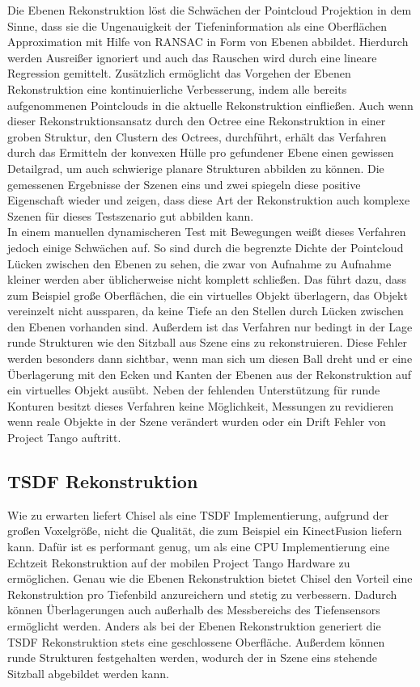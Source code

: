 Die Ebenen Rekonstruktion löst die Schwächen der Pointcloud Projektion in dem Sinne, dass sie die Ungenauigkeit der Tiefeninformation als eine Oberflächen Approximation mit Hilfe von RANSAC in Form von Ebenen abbildet. Hierdurch werden Ausreißer ignoriert und auch das Rauschen wird durch eine lineare Regression gemittelt. Zusätzlich ermöglicht das Vorgehen der Ebenen Rekonstruktion eine kontinuierliche Verbesserung, indem alle bereits aufgenommenen Pointclouds in die aktuelle Rekonstruktion einfließen. Auch wenn dieser Rekonstruktionsansatz durch den Octree eine Rekonstruktion in einer groben Struktur, den Clustern des Octrees, durchführt, erhält das Verfahren durch das Ermitteln der konvexen Hülle pro gefundener Ebene einen gewissen Detailgrad, um auch schwierige planare Strukturen abbilden zu können. Die gemessenen Ergebnisse der Szenen eins und zwei spiegeln diese positive Eigenschaft wieder und zeigen, dass diese Art der Rekonstruktion auch komplexe Szenen für dieses Testszenario gut abbilden kann.\\

In einem manuellen dynamischeren Test mit Bewegungen weißt dieses Verfahren jedoch einige Schwächen auf. So sind durch die begrenzte Dichte der Pointcloud Lücken zwischen den Ebenen zu sehen, die zwar von Aufnahme zu Aufnahme kleiner werden aber üblicherweise nicht komplett schließen. Das führt dazu, dass zum Beispiel große Oberflächen, die ein virtuelles Objekt überlagern, das Objekt vereinzelt nicht aussparen, da keine Tiefe an den Stellen durch Lücken zwischen den Ebenen vorhanden sind. Außerdem ist das Verfahren nur bedingt in der Lage runde Strukturen wie den Sitzball aus Szene eins zu rekonstruieren. Diese Fehler werden besonders dann sichtbar, wenn man sich um diesen Ball dreht und er eine Überlagerung mit den Ecken und Kanten der Ebenen aus der Rekonstruktion auf ein virtuelles Objekt ausübt. Neben der fehlenden Unterstützung für runde Konturen besitzt dieses Verfahren keine Möglichkeit, Messungen zu revidieren wenn reale Objekte in der Szene verändert wurden oder ein Drift Fehler von Project Tango auftritt.

\subsection*{TSDF Rekonstruktion}

Wie zu erwarten liefert Chisel als eine TSDF Implementierung, aufgrund der großen Voxelgröße, nicht die Qualität, die zum Beispiel ein KinectFusion liefern kann. Dafür ist es performant genug, um als eine CPU Implementierung eine Echtzeit Rekonstruktion auf der mobilen Project Tango Hardware zu ermöglichen. Genau wie die Ebenen Rekonstruktion bietet Chisel den Vorteil eine Rekonstruktion pro Tiefenbild anzureichern und stetig zu verbessern. Dadurch können Überlagerungen auch außerhalb des Messbereichs des Tiefensensors ermöglicht werden. Anders als bei der Ebenen Rekonstruktion generiert die TSDF Rekonstruktion stets eine geschlossene Oberfläche. Außerdem können runde Strukturen festgehalten werden, wodurch der in Szene eins stehende Sitzball abgebildet werden kann. \\

